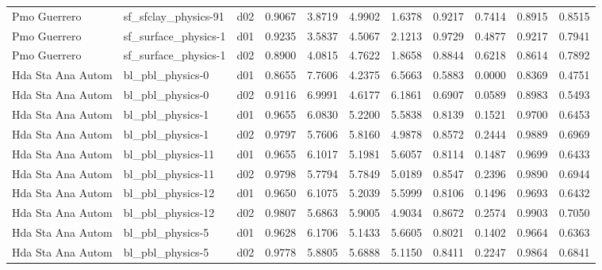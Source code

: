 \begin{longtable}{lllrrrrrrrr}
         Pmo Guerrero  &  sf\_sfclay\_physics-91 &     d02 &   0.9067 &   3.8719 &   4.9902 &       1.6378 &        0.9217 &       0.7414 &           0.8915 &  0.8515 \\
         Pmo Guerrero  &  sf\_surface\_physics-1 &     d01 &   0.9235 &   3.5837 &   4.5067 &       2.1213 &        0.9729 &       0.4877 &           0.9217 &  0.7941 \\
         Pmo Guerrero  &  sf\_surface\_physics-1 &     d02 &   0.8900 &   4.0815 &   4.7622 &       1.8658 &        0.8844 &       0.6218 &           0.8614 &  0.7892 \\
    Hda Sta Ana Autom  &      bl\_pbl\_physics-0 &     d01 &   0.8655 &   7.7606 &   4.2375 &       6.5663 &        0.5883 &       0.0000 &           0.8369 &  0.4751 \\
    Hda Sta Ana Autom  &      bl\_pbl\_physics-0 &     d02 &   0.9116 &   6.9991 &   4.6177 &       6.1861 &        0.6907 &       0.0589 &           0.8983 &  0.5493 \\
    Hda Sta Ana Autom  &      bl\_pbl\_physics-1 &     d01 &   0.9655 &   6.0830 &   5.2200 &       5.5838 &        0.8139 &       0.1521 &           0.9700 &  0.6453 \\
    Hda Sta Ana Autom  &      bl\_pbl\_physics-1 &     d02 &   0.9797 &   5.7606 &   5.8160 &       4.9878 &        0.8572 &       0.2444 &           0.9889 &  0.6969 \\
    Hda Sta Ana Autom  &     bl\_pbl\_physics-11 &     d01 &   0.9655 &   6.1017 &   5.1981 &       5.6057 &        0.8114 &       0.1487 &           0.9699 &  0.6433 \\
    Hda Sta Ana Autom  &     bl\_pbl\_physics-11 &     d02 &   0.9798 &   5.7794 &   5.7849 &       5.0189 &        0.8547 &       0.2396 &           0.9890 &  0.6944 \\
    Hda Sta Ana Autom  &     bl\_pbl\_physics-12 &     d01 &   0.9650 &   6.1075 &   5.2039 &       5.5999 &        0.8106 &       0.1496 &           0.9693 &  0.6432 \\
    Hda Sta Ana Autom  &     bl\_pbl\_physics-12 &     d02 &   0.9807 &   5.6863 &   5.9005 &       4.9034 &        0.8672 &       0.2574 &           0.9903 &  0.7050 \\
    Hda Sta Ana Autom  &      bl\_pbl\_physics-5 &     d01 &   0.9628 &   6.1706 &   5.1433 &       5.6605 &        0.8021 &       0.1402 &           0.9664 &  0.6363 \\
    Hda Sta Ana Autom  &      bl\_pbl\_physics-5 &     d02 &   0.9778 &   5.8805 &   5.6888 &       5.1150 &        0.8411 &       0.2247 &           0.9864 &  0.6841 \\

\end{longtable}

